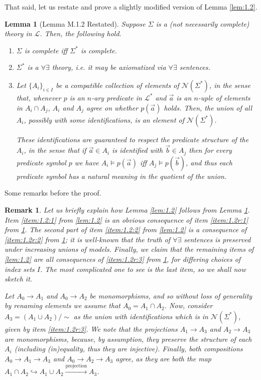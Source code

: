 \documentclass{article}
\newtheorem{lemma}[theorem]{Lemma}
\newtheorem{remark}[theorem]{Remark}
\theoremstyle{nonumberplain}
\newcommand{\Lang}{\mathcal{L}}
\newcommand{\calN}{\mathcal{N}}
\begin{document}
That said, let us restate and prove a slightly modified version of Lemma \ref{lem:1.2}.

\begin{lemma}[Lemma M.1.2 Restated]\label{lem:1.2r}
Suppose $\Sigma$ is a (not necessarily complete) theory in $\Lang$. Then, the following hold.
\begin{enumerate}
\item\label{item:1.2r:1} $\Sigma$ is complete iff $\Sigma^*$ is complete.
\item\label{item:1.2r:2} $\Sigma^*$ is a $\forall \exists$ theory, i.e. it may be axiomatized via $\forall\exists$ sentences.
\item\label{item:1.2r:3} Let $\{A_i\}_{i \in I}$ be a compatible collection of elements of $\calN(\Sigma^*)$, in the sense that, whenever $p$ is an $n$-ary predicate in $\Lang^*$ and $\vec a$ is an $n$-uple of elements in $A_i \cap A_j$, $A_i$ and $A_j$ agree on whether $p(\vec a)$ holds. Then, the union of all $A_i$, possibly with some identifications, is an element of $\calN(\Sigma^*)$.

These identifications are guaranteed to respect the predicate structure of the $A_i$, in the sense that if $\vec a \in A_i$ is identified with $\vec b \in A_j$ then for every predicate symbol $p$ we have $A_i \vDash p(\vec a)$ iff $A_j \vDash p(\vec b)$, and thus each predicate symbol has a natural meaning in the quotient of the union.
\end{enumerate}
\end{lemma}

Some remarks before the proof.

\begin{remark}
Let us briefly explain how Lemma \ref{lem:1.2} follows from Lemma \ref{lem:1.2r}. Item \ref{item:1.2:1} from \ref{lem:1.2} is an obvious consequence of item \ref{item:1.2r:1} from \ref{lem:1.2r}. The second part of item \ref{item:1.2:2} from \ref{lem:1.2} is a consequence of \ref{item:1.2r:2} from \ref{lem:1.2r}; it is well-known that the truth of $\forall\exists$ sentences is preserved under increasing unions of models. Finally, we claim that the remaining items of \ref{lem:1.2} are all consequences of \ref{item:1.2r:3} from \ref{lem:1.2r}, for differing choices of index sets $I$. The most complicated one to see is the last item, so we shall now sketch it.

Let $A_0 \to A_1$ and $A_0 \to A_2$ be monomorphisms, and so without loss of generality by renaming elements we assume that $A_0 = A_1 \cap A_2$. Now, consider $A_3 = (A_1 \cup A_2)/\sim$ as the union with identifications which is in $\calN(\Sigma^*)$, given by item \ref{item:1.2r:3}. We note that the projections $A_1 \to A_3$ and $A_2 \to A_3$ are monomorphisms, because, by assumption, they preserve the structure of each $A_i$ (including (in)equality, thus they are injective). Finally, both compositions $A_0 \to A_1 \to A_3$ and $A_0 \to A_2 \to A_3$ agree, as they are both the map ${A_1 \cap A_2 \hookrightarrow A_1 \cup A_2 \xrightarrow{\text{projection}} A_3}$.
\end{remark}
\end{document}
